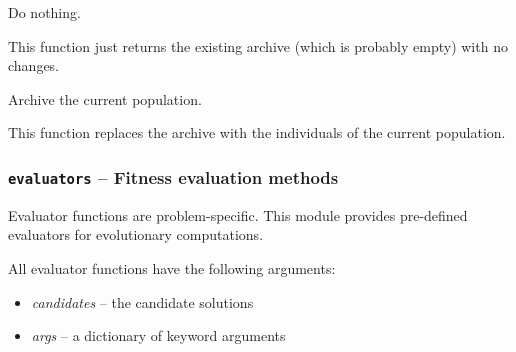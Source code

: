 \documentclass[letterpaper,10pt,english]{sphinxmanual}
\begin{document}

\begin{fulllineitems}
\label{reference:inspyred.ec.archivers.default_archiver}
Do nothing.

This function just returns the existing archive (which is
probably empty) with no changes.

\end{fulllineitems}


\begin{fulllineitems}
\label{reference:inspyred.ec.archivers.population_archiver}
Archive the current population.

This function replaces the archive with the individuals 
of the current population.

\end{fulllineitems}

\label{reference:module-inspyred.ec.evaluators}

\subsubsection{\texttt{evaluators} -- Fitness evaluation methods}
\label{reference:evaluators-fitness-evaluation-methods}
Evaluator functions are problem-specific. This module provides pre-defined 
evaluators for evolutionary computations.

All evaluator functions have the following arguments:
\begin{itemize}
\item {} 
\emph{candidates} -- the candidate solutions

\item {} 
\emph{args} -- a dictionary of keyword arguments

\end{itemize}
\label{reference:module-evaluators}
\end{document}
